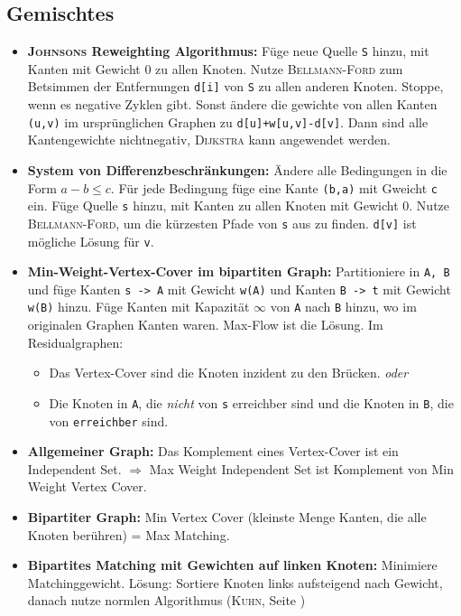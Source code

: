 \subsection{Gemischtes}
\begin{itemize}
	\item \textbf{\textsc{Johnsons} Reweighting Algorithmus:}
	Füge neue Quelle \lstinline{S} hinzu, mit Kanten mit Gewicht 0 zu allen Knoten.
	Nutze \textsc{Bellmann-Ford} zum Betsimmen der Entfernungen \lstinline{d[i]} von \lstinline{S} zu allen anderen Knoten.
	Stoppe, wenn es negative Zyklen gibt.
	Sonst ändere die gewichte von allen Kanten \lstinline{(u,v)} im ursprünglichen Graphen zu \lstinline{d[u]+w[u,v]-d[v]}.
	Dann sind alle Kantengewichte nichtnegativ, \textsc{Dijkstra} kann angewendet werden.

	\item \textbf{System von Differenzbeschränkungen:}
	Ändere alle Bedingungen in die Form $a-b \leq c$.
	Für jede Bedingung füge eine Kante \lstinline{(b,a)} mit Gweicht \lstinline{c} ein.
	Füge Quelle \lstinline{s} hinzu, mit Kanten zu allen Knoten mit Gewicht 0.
	Nutze \textsc{Bellmann-Ford}, um die kürzesten Pfade von \lstinline{s} aus zu finden.
	\lstinline{d[v]} ist mögliche Lösung für \lstinline{v}.

	\item \textbf{Min-Weight-Vertex-Cover im bipartiten Graph:}
	Partitioniere in \lstinline{A, B} und füge Kanten \lstinline{s -> A} mit Gewicht \lstinline{w(A)} und Kanten  \lstinline{B -> t} mit Gewicht \lstinline{w(B)} hinzu.
	Füge Kanten mit Kapazität $\infty$ von \lstinline{A} nach \lstinline{B} hinzu, wo im originalen Graphen Kanten waren.
	Max-Flow ist die Lösung.\newline
	Im Residualgraphen:
	\begin{itemize}[nosep]
		\item Das Vertex-Cover sind die Knoten inzident zu den Brücken. \emph{oder}
		\item Die Knoten in \lstinline{A}, die \emph{nicht} von \lstinline{s} erreichber sind und die Knoten in \lstinline{B}, die von \lstinline{erreichber} sind.
	\end{itemize}

	\item \textbf{Allgemeiner Graph:}
	Das Komplement eines Vertex-Cover ist ein Independent Set.
	$\Rightarrow$ Max Weight Independent Set ist Komplement von Min Weight Vertex Cover.

	\item \textbf{Bipartiter Graph:}
	Min Vertex Cover (kleinste Menge Kanten, die alle Knoten berühren) = Max Matching.

	\item \textbf{Bipartites Matching mit Gewichten auf linken Knoten:}
	Minimiere Matchinggewicht.
	Lösung: Sortiere Knoten links aufsteigend nach Gewicht, danach nutze normlen Algorithmus (\textsc{Kuhn}, Seite \pageref{kuhn})
\end{itemize}
